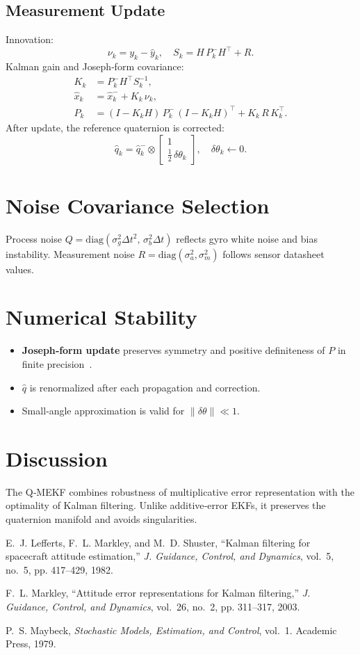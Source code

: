 \documentclass[12pt]{article}
\begin{document}
\subsection{Measurement Update}
Innovation:
\[
\nu_k = y_k - \hat y_k,\quad
S_k = H\,P^-_k H^\top + R.
\]
Kalman gain and Joseph‐form covariance:
\begin{align*}
K_k &= P^-_k H^\top S_k^{-1},\\
\hat x_k &= \hat x^-_k + K_k\,\nu_k,\\
P_k &= (I-K_kH)\,P^-_k\,(I-K_kH)^\top + K_k\,R\,K_k^\top.
\end{align*}
After update, the reference quaternion is corrected:
\[
\hat q_k = \hat q^-_k \otimes \begin{bmatrix}1\\\tfrac12\,\delta\theta_k\end{bmatrix}, 
\quad \delta\theta_k \leftarrow 0.
\]

\section{Noise Covariance Selection}
Process noise \(Q = \mathrm{diag}(\sigma_g^2\Delta t^2,\,\sigma_b^2\Delta t)\) reflects gyro white noise and bias instability.  Measurement noise \(R = \mathrm{diag}(\sigma_a^2,\sigma_m^2)\) follows sensor datasheet values.

\section{Numerical Stability}
\begin{itemize}
  \item \textbf{Joseph‐form update} preserves symmetry and positive definiteness of \(P\) in finite precision~\cite{Maybeck1979}.
  \item \(\hat q\) is renormalized after each propagation and correction.
  \item Small‐angle approximation is valid for \(\|\delta\theta\|\ll1\).
\end{itemize}

\section{Discussion}
The Q‐MEKF combines robustness of multiplicative error representation with the optimality of Kalman filtering.  Unlike additive‐error EKFs, it preserves the quaternion manifold and avoids singularities.

\begin{thebibliography}{9}
E.~J. Lefferts, F.~L. Markley, and M.~D. Shuster, “Kalman filtering for spacecraft attitude estimation,” \emph{J. Guidance, Control, and Dynamics}, vol.~5, no.~5, pp. 417–429, 1982.

F.~L. Markley, “Attitude error representations for Kalman filtering,” \emph{J. Guidance, Control, and Dynamics}, vol.~26, no.~2, pp. 311–317, 2003.

P.~S. Maybeck, \emph{Stochastic Models, Estimation, and Control}, vol.~1. Academic Press, 1979.

\end{thebibliography}
\end{document}
